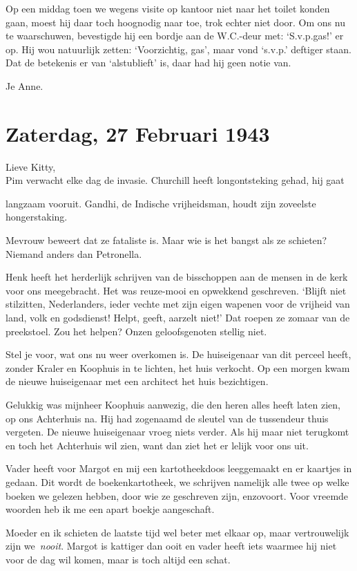 \documentclass{book}
\begin{document}
Op een middag toen we wegens visite op kantoor niet naar het toilet
konden gaan, moest hij daar toch hoognodig naar toe, trok echter niet
door. Om ons nu te waarschuwen, bevestigde hij een bordje aan de
W.C.-deur met: `S.v.p.gas!' er op. Hij wou natuurlijk zetten:
`Voorzichtig, gas', maar vond `s.v.p.' deftiger staan. Dat de betekenis
er van `alstublieft' is, daar had hij geen notie van.

Je Anne.

\chapter{Zaterdag, 27 Februari 1943}

Lieve Kitty,\\Pim verwacht elke dag de invasie. Churchill heeft
longontsteking gehad, hij gaat

langzaam vooruit. Gandhi, de Indische vrijheidsman, houdt zijn zoveelste
hongerstaking.

Mevrouw beweert dat ze fataliste is. Maar wie is het bangst als ze
schieten? Niemand anders dan Petronella.

Henk heeft het herderlijk schrijven van de bisschoppen aan de mensen in
de kerk voor ons meegebracht. Het was reuze-mooi en opwekkend
geschreven. `Blijft niet stilzitten, Nederlanders, ieder vechte met zijn
eigen wapenen voor de vrijheid van land, volk en godsdienst! Helpt,
geeft, aarzelt niet!' Dat roepen ze zomaar van de preekstoel. Zou het
helpen? Onzen geloofsgenoten stellig niet.

Stel je voor, wat ons nu weer overkomen is. De huiseigenaar van dit
perceel heeft, zonder Kraler en Koophuis in te lichten, het huis
verkocht. Op een morgen kwam de nieuwe huiseigenaar met een architect
het huis bezichtigen.

Gelukkig was mijnheer Koophuis aanwezig, die den heren alles heeft laten
zien, op ons Achterhuis na. Hij had zogenaamd de sleutel van de
tussendeur thuis vergeten. De nieuwe huiseigenaar vroeg niets verder.
Als hij maar niet terugkomt en toch het Achterhuis wil zien, want dan
ziet het er lelijk voor ons uit.

Vader heeft voor Margot en mij een kartotheekdoos leeggemaakt en er
kaartjes in gedaan. Dit wordt de boekenkartotheek, we schrijven namelijk
alle twee op welke boeken we gelezen hebben, door wie ze geschreven
zijn, enzovoort. Voor vreemde woorden heb ik me een apart boekje
aangeschaft.

Moeder en ik schieten de laatste tijd wel beter met elkaar op, maar
vertrouwelijk zijn we~\emph{nooit}. Margot is kattiger dan ooit en vader
heeft iets waarmee hij niet voor de dag wil komen, maar is toch altijd
een schat.
\end{document}
